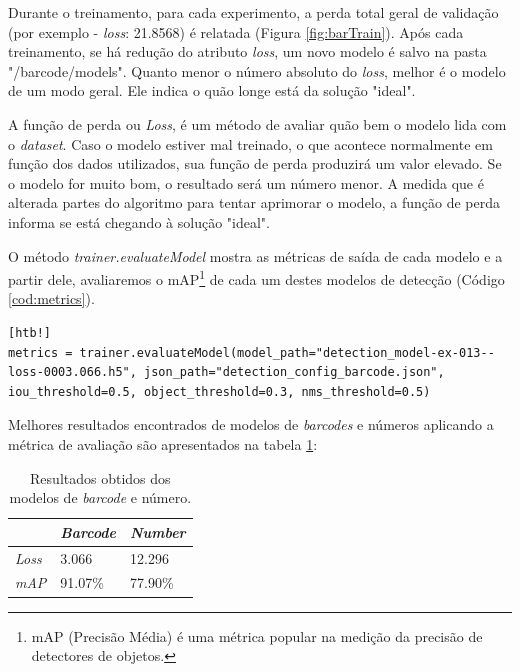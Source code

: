 Durante o treinamento, para cada experimento, a perda total geral de validação (por exemplo - \textit{loss}: 21.8568) é relatada (Figura \ref{fig:barTrain}).
%
Após cada treinamento, se há redução do atributo \textit{loss}, um novo modelo é salvo na pasta "/barcode/models". Quanto menor o número absoluto do \textit{loss}, melhor é o modelo de um modo geral. Ele indica o quão longe está da solução "ideal". 

A função de perda ou \textit{Loss}, é um método de avaliar quão bem o modelo lida com o \textit{dataset}. Caso o modelo estiver mal treinado, o que acontece normalmente em função dos dados utilizados, sua função de perda produzirá um valor elevado. Se o modelo for muito bom, o resultado será um número menor. A medida que é alterada partes do  algoritmo para tentar aprimorar o modelo, a função de perda informa se está chegando à solução "ideal".

O método \textit{trainer.evaluateModel} mostra as métricas de saída de cada modelo e a partir dele, avaliaremos o mAP\footnote{mAP (Precisão Média) é uma métrica popular na medição da precisão de detectores de objetos.} de cada um destes modelos de detecção (Código \ref{cod:metrics}).

\begin{lstlisting}[caption=Métricas de saída do modelo, label=cod:metrics][htb!]
metrics = trainer.evaluateModel(model_path="detection_model-ex-013--loss-0003.066.h5", json_path="detection_config_barcode.json", iou_threshold=0.5, object_threshold=0.3, nms_threshold=0.5)
\end{lstlisting}

Melhores resultados encontrados de modelos de \textit{barcodes} e números aplicando a métrica de avaliação são apresentados na tabela \ref{tab:Result}:

\begin{table}[H]
	\centering
	\begin{tabular}{|l|l|l|}
		\hline
		\rowcolor[HTML]{ECF4FF} 
		\multicolumn{1}{|c|}{\cellcolor[HTML]{ECF4FF}\textit{Característica}} &
		\multicolumn{1}{|c|}{\cellcolor[HTML]{ECF4FF}\textit{Barcode}} & \multicolumn{1}{c|}{\cellcolor[HTML]{ECF4FF}\textit{Number}}\\ \hline
		\textit{Loss} & 3.066 & 12.296\\ \hline
		\textit{mAP} & 91.07\% & 77.90\%  \\ \hline
	\end{tabular}
	\caption{Resultados obtidos dos modelos de \textit{barcode} e número.}
	\label{tab:Result}
\end{table}

